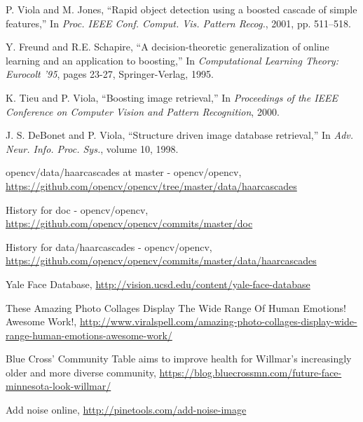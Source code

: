 \documentclass[10pt,twocolumn,letterpaper]{article}
\begin{document}
\begin{thebibliography}{99}
P. Viola and M. Jones, ``Rapid object detection using a boosted cascade of simple features,''
In \textit{Proc. IEEE Conf. Comput. Vis. Pattern Recog.}, 2001, pp. 511–518.

Y. Freund and R.E. Schapire, ``A decision-theoretic generalization of online learning and an application to boosting,''
In \textit{Computational Learning Theory: Eurocolt '95}, pages 23-27, Springer-Verlag, 1995.

K. Tieu and P. Viola, ``Boosting image retrieval,''
In \textit{Proceedings of the IEEE Conference on Computer Vision and Pattern Recognition}, 2000.

J. S. DeBonet and P. Viola, ``Structure driven image database retrieval,''
In \textit{Adv. Neur. Info. Proc. Sys.}, volume 10, 1998.

opencv/data/haarcascades at master - opencv/opencv,
\url{https://github.com/opencv/opencv/tree/master/data/haarcascades}

History for doc - opencv/opencv,
\url{https://github.com/opencv/opencv/commits/master/doc}

History for data/haarcascades - opencv/opencv,
\url{https://github.com/opencv/opencv/commits/master/data/haarcascades}

Yale Face Database,
\url{http://vision.ucsd.edu/content/yale-face-database}

These Amazing Photo Collages Display The Wide Range Of Human Emotions! Awesome Work!,
\url{http://www.viralspell.com/amazing-photo-collages-display-wide-range-human-emotions-awesome-work/}

Blue Cross' Community Table aims to improve health for Willmar's increasingly older and more diverse community,
\url{https://blog.bluecrossmn.com/future-face-minnesota-look-willmar/}

Add noise online,
\url{http://pinetools.com/add-noise-image}

\end{thebibliography}
\end{document}
